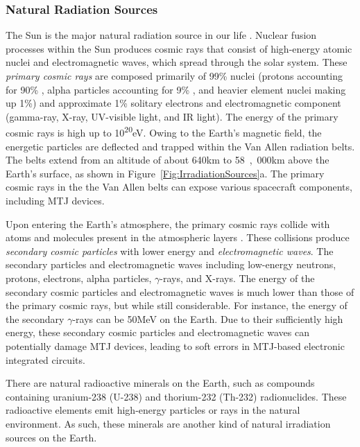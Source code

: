 \documentclass[molecules,review,submit,pdftex,moreauthors]{Definitions/mdpi}
\begin{document}
\subsubsection{Natural Radiation Sources}


The Sun is the major natural radiation source in our life .  Nuclear fusion processes within the Sun produces cosmic rays that consist of high-energy atomic nuclei and electromagnetic waves, which spread through the solar system.  These \emph{primary cosmic rays} are composed primarily of \unit{99}{\%} nuclei (protons accounting for \unit{90}{\%} , alpha particles accounting for \unit{9}{\%} , and heavier element nuclei making up \unit{1}{\%}) and approximate \unit{1}{\%} solitary electrons and electromagnetic component (gamma-ray, X-ray, UV-visible light, and IR light).  The energy of the primary cosmic rays is high up to \unit{10^{20}}{eV}.  Owing to the Earth's magnetic field, the energetic particles are deflected and trapped within the Van Allen radiation belts.  The belts extend from an altitude of about \unit{640}{km} to \unit{58,000}{km} above the Earth's surface, as shown in Figure~\ref{Fig:IrradiationSources}a.  The primary cosmic rays in the  the Van Allen belts can expose various spacecraft components, including MTJ devices. 


Upon entering the Earth's atmosphere, the primary cosmic rays collide with atoms and molecules present in the atmospheric layers .  These collisions produce \emph{secondary cosmic particles} with lower energy and \emph{electromagnetic waves}.  The secondary particles and electromagnetic waves including low-energy neutrons, protons, electrons, alpha particles, $\gamma$-rays, and X-rays.  The energy of the secondary cosmic particles and electromagnetic waves is much lower than those of the primary cosmic rays, but while still considerable.  For instance, the energy of the secondary $\gamma$-rays can be \unit{50}{MeV} on the Earth.  Due to their sufficiently high energy, these secondary cosmic particles and electromagnetic waves can potentially damage MTJ devices, leading to soft errors in MTJ-based electronic integrated circuits. 


There are natural radioactive minerals on the Earth, such as compounds containing uranium-238 (U-238) and thorium-232 (Th-232) radionuclides.  These radioactive elements emit high-energy particles or rays in the natural environment.  As such, these minerals are another kind of natural irradiation sources on the Earth.
\end{document}
